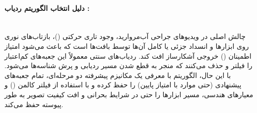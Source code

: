 \documentclass{article}
\begin{document}
\paragraph{دلیل انتخاب الگوریتم ردیاب :} \mbox{}\\
چالش اصلی در ویدیوهای جراحی آب‌مروارید، وجود تاری حرکتی ()، بازتاب‌های نوری روی ابزارها و انسداد جزئی یا کامل آن‌ها توسط بافت‌ها است که باعث می‌شود امتیاز اطمینان () خروجی آشکارساز افت کند. ردیاب‌های سنتی معمولاً این جعبه‌های کم‌اعتبار را فیلتر و حذف می‌کنند که منجر به قطع شدن مسیر ردیابی و پرش شناسه‌ها می‌شود. با این حال، الگوریتم  با معرفی یک مکانیزم پیشرفته دو مرحله‌ای، تمام جعبه‌های پیشنهادی (حتی موارد با امتیاز پایین) را حفظ کرده و با استفاده از فیلتر کالمن () و معیارهای هندسی، مسیر ابزارها را حتی در شرایط بحرانی و افت کیفیت تصویر به طور پیوسته حفظ می‌کند.
\end{document}
